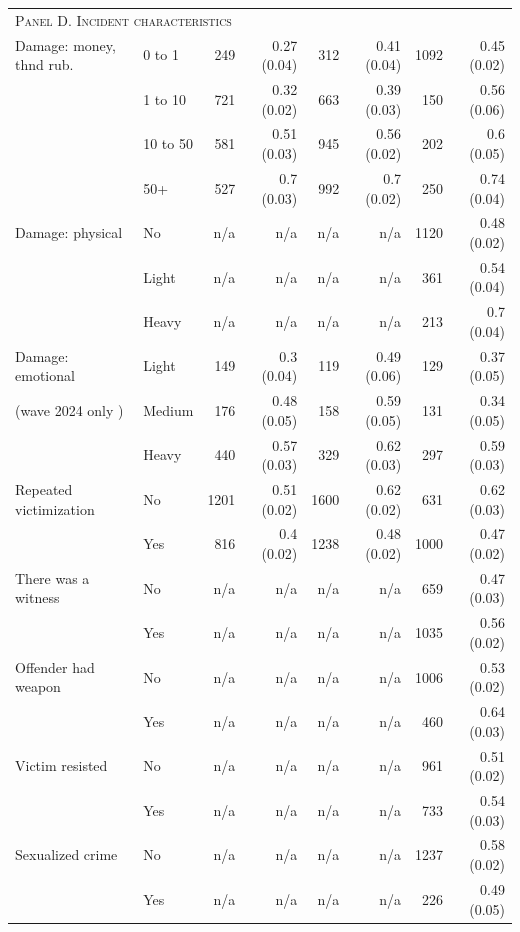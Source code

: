 \begin{tabular}{p{1.9in}p{1.5in}rrrrrr}
	\midrule
	\multicolumn{8}{l}{\textsc{Panel D. Incident characteristics}} \\
	Damage: money, thnd rub. & 0 to 1 & 249 & 0.27 (0.04) & 312 & 0.41 (0.04) & 1092 & 0.45 (0.02) \\ 
	& 1 to 10 & 721 & 0.32 (0.02) & 663 & 0.39 (0.03) & 150 & 0.56 (0.06) \\ 
	& 10 to 50 & 581 & 0.51 (0.03) & 945 & 0.56 (0.02) & 202 & 0.6 (0.05) \\ 
	& 50+ & 527 & 0.7 (0.03) & 992 & 0.7 (0.02) & 250 & 0.74 (0.04) \\ 
		 	\addlinespace[4pt]
	Damage: physical & No & n/a &  n/a &  n/a &  n/a  & 1120 & 0.48 (0.02) \\ 
	& Light & n/a &  n/a &  n/a &  n/a & 361 & 0.54 (0.04) \\ 
	& Heavy & n/a &  n/a &  n/a &  n/a  & 213 & 0.7 (0.04) \\ 
		 	\addlinespace[4pt]
	Damage: emotional & Light & 149 & 0.3 (0.04) & 119 & 0.49 (0.06) & 129 & 0.37 (0.05) \\ 
	(wave 2024 only )& Medium & 176 & 0.48 (0.05) & 158 & 0.59 (0.05) & 131 & 0.34 (0.05) \\ 
	& Heavy & 440 & 0.57 (0.03) & 329 & 0.62 (0.03) & 297 & 0.59 (0.03) \\ 
			 	\addlinespace[4pt]
	Repeated victimization & No & 1201 & 0.51 (0.02) & 1600 & 0.62 (0.02) & 631 & 0.62 (0.03) \\ 
	& Yes & 816 & 0.4 (0.02) & 1238 & 0.48 (0.02) & 1000 & 0.47 (0.02) \\ 
		 	\addlinespace[4pt]
	There was a witness & No &  n/a &  n/a &  n/a &  n/a  & 659 & 0.47 (0.03) \\ 
	& Yes &  n/a &  n/a &  n/a &  n/a  & 1035 & 0.56 (0.02) \\ 
		 	\addlinespace[4pt]
	Offender had weapon & No & n/a & n/a &  n/a &  n/a  & 1006 & 0.53 (0.02) \\ 
	& Yes &  n/a & n/a &  n/a &  n/a & 460 & 0.64 (0.03) \\ 
		 	\addlinespace[4pt]
	Victim resisted & No & n/a & n/a &  n/a &  n/a & 961 & 0.51 (0.02) \\ 
	& Yes & n/a & n/a &  n/a &  n/a & 733 & 0.54 (0.03) \\ 
		 	\addlinespace[4pt]
	Sexualized crime & No &  n/a & n/a &  n/a &  n/a & 1237 & 0.58 (0.02) \\ 
	& Yes &  n/a & n/a &  n/a &  n/a& 226 & 0.49 (0.05) \\ 
	

\end{tabular}
